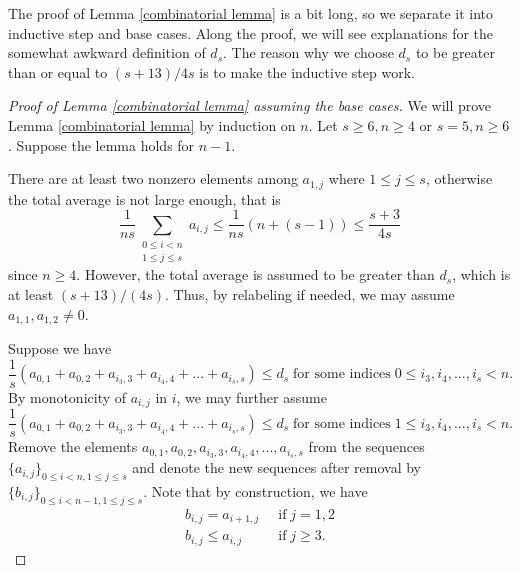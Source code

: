 \documentclass[11pt]{amsart}
\theoremstyle{plain} %
\theoremstyle{remark}
\numberwithin{equation}{section}
\begin{document}
The proof of Lemma \ref{combinatorial lemma} is a bit long, so we separate it into inductive step and base cases. Along the proof, we will see explanations for the somewhat awkward definition of $d_s$. The reason why we choose $d_s$ to be greater than or equal to $(s+13)/4s$ is to make the inductive step work.

\begin{proof}[Proof of Lemma \ref{combinatorial lemma} assuming the base cases]
    We will prove Lemma \ref{combinatorial lemma} by induction on $n$. Let $s\geq 6, n\geq 4$ or $s=5, n\geq 6$. Suppose the lemma holds for $n-1$.

    There are at least two nonzero elements among $a_{1,j}$ where $1\leq j\leq s$, otherwise the total average is not large enough, that is
    \begin{equation*}
        \frac{1}{ns}\sum_{\substack{0\leq i<n\\1\leq j\leq s}}a_{i,j}\leq \frac{1}{ns}(n+(s-1))\leq \frac{s+3}{4s}
    \end{equation*}
    since $n\geq 4$. However, the total average is assumed to be greater than $d_s$, which is at least $(s+13)/(4s)$. Thus, by relabeling if needed, we may assume $a_{1,1},a_{1,2}\neq 0$.

    Suppose we have
    \begin{equation*}
        \frac{1}{s}(a_{0,1}+a_{0,2}+a_{i_3,3}+a_{i_4,4}+...+a_{i_s,s})\leq d_s\;\text{for some indices}\;0\leq i_3,i_4,...,i_s<n.
    \end{equation*}
    By monotonicity of $a_{i,j}$ in $i$, we may further assume
    \begin{equation*}
        \frac{1}{s}(a_{0,1}+a_{0,2}+a_{i_3,3}+a_{i_4,4}+...+a_{i_s,s})\leq d_s\;\text{for some indices}\;1\leq i_3,i_4,...,i_s<n.
    \end{equation*}
    Remove the elements $a_{0,1},a_{0,2},a_{i_3,3},a_{i_4,4},...,a_{i_s,s}$ from the sequences $\{a_{i,j}\}_{0\leq i<n,1\leq j\leq s}$ and denote the new sequences after removal by $\{b_{i,j}\}_{0\leq i<n-1,1\leq j\leq s}$. Note that by construction, we have
    \begin{equation}\label{eqs: combinatorial lemma 1}
        \begin{split}
            b_{i,j}=a_{i+1,j}&\;\;\text{if}\;j=1,2\\
            b_{i,j}\leq a_{i,j}&\;\;\text{if}\;j\geq 3.
        \end{split}
    \end{equation}


\end{proof}
\end{document}

